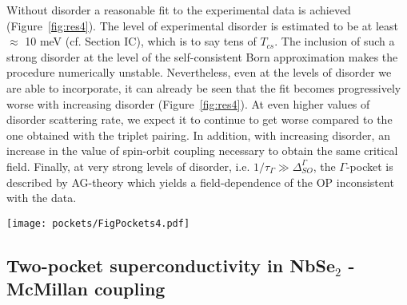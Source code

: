 \documentclass[showpacs,superscriptaddress,onecolumn,prb]{revtex4}
\begin{document}
Without disorder a reasonable fit to the experimental data is achieved (Figure~\ref{fig:res4}). The level of experimental disorder is estimated to be at least $\approx$ 10 meV (cf. Section IC), which is to say tens of $T_{cs}$. The inclusion of such a strong disorder at the level of the self-consistent Born approximation makes the procedure numerically unstable. 
Nevertheless, even at the levels of disorder we are able to incorporate, it can already be seen that the fit becomes progressively worse with increasing disorder (Figure~\ref{fig:res4}). At even higher values of disorder scattering rate, we expect it to continue to get worse compared to the one obtained with the triplet pairing. 
In addition, with increasing disorder, an increase in the value of spin-orbit coupling necessary to obtain the same critical field. Finally, at very strong levels of disorder, i.e. $1/\tau_{\Gamma} \gg \Delta_{SO}^\Gamma$, the $\Gamma$-pocket is described by AG-theory which yields a field-dependence of the OP inconsistent with the data.


\begin{figure*}%
\centering
\texttt{[image: pockets/FigPockets4.pdf]}
\caption{\label{fig:res4} 
The OP as a function of $E_Z$. The black and blue lines have $K$ and $\Gamma$ equal pairing interactions  and are calculated by numerically solving Eq.~ \eqref{eq:self_lambda_equal_nu} for the clean case (black line) and with a high impurity scattering rate of $\tau_{\Gamma}^{-1} = 10$ (blue line). The dashed and dotted lines show the OP in the clean case with only the $K$ and $\Gamma$ pocket pairings, respectively. 
These are found by replacing in Eq.~\eqref{eq:self_lambda_equal_nu} $f_{0}^{\Gamma}$ by $f_{0}^{K}$ for the $K$ pocket and replacing $f_{0}^{K}$ with the $f_{0}^{\Gamma}$ for the $\Gamma$ pocket. 
The green dots show the experimental data and the SOC for each line is taken to fit the experimental critical field. 
The parameters  $\tau^{-1}_{\Gamma}$ and $E_{\mathrm{SO}}^{\Gamma},E_{\mathrm{SO}}^{K}$ are in units of $T_{c0}$ and for the black and blue lines we take $E_{\mathrm{SO}}^{K}/E_{\mathrm{SO}}^{\Gamma}=2.14$. 
}
\end{figure*}

\FloatBarrier

\subsection{Two-pocket superconductivity in NbSe$_2$ - McMillan coupling}
\label{sec-mm}
\end{document}
